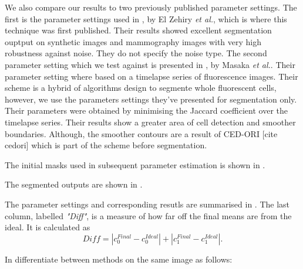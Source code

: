 We also compare our results  to two previously published parameter settings.
The first is the parameter settings used in \citep{ElZehiry2007}, by El Zehiry \textit{et al.}, which is where this technique was first published. Their results showed excellent segmentation ouptput on synthetic images and mammography images with very high robustness against noise. They do not specify the noise type.
The second parameter setting which we test against is presented in \citep{Maska2013}, by Masaka \textit{et al.}. Their parameter setting where based on a timelapse series of fluorescence images. Their scheme is a hybrid of algorithms design to segmente whole fluorescent cells, however, we use the parameters settings they've presented for segmentation only. Their parameters were obtained by minimising the Jaccard coefficient over the timelapse series. Their results show a greater area of cell detection and smoother boundaries. Although, the smoother contours are a result of CED-ORI [cite cedori] which is part of the scheme before segmentation.

The initial masks used in subsequent parameter estimation is shown in .

The segmented outputs are shown in .

The parameter settings and corresponding resutls are summarised in . The last column, labelled \textit{"Diff"}, is a measure of how far off the final means are from the ideal. It is calculated as 
\begin{equation*}
	Diff = |c_{0}^{Final}-c_{0}^{Ideal}| + |c_{1}^{Final}-c_{1}^{Ideal}|.
\end{equation*}

In  differentiate between methods on the same image as follows:

